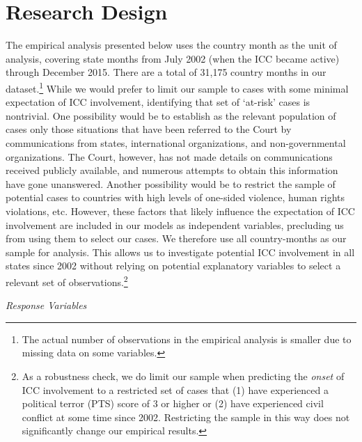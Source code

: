 \section*{Research Design}

The empirical analysis presented below uses the country month as the unit of analysis, covering state months from July 2002 (when the ICC became active) through December 2015. There are a total of 31,175 country months in our dataset.\footnote{The actual number of observations in the empirical analysis is smaller due to missing data on some variables.} While we would prefer to limit our sample to cases with some minimal expectation of ICC involvement, identifying that set of `at-risk' cases is nontrivial. One possibility would be to establish as the relevant population of cases only those situations that have been referred to the Court by communications from states, international organizations, and non-governmental organizations. The Court, however, has not made details on communications received publicly available, and numerous attempts to obtain this information have gone unanswered. Another possibility would be to restrict the sample of potential cases to countries with high levels of one-sided violence, human rights violations, etc. However, these factors that likely influence the expectation of ICC involvement are included in our models as independent variables, precluding us from using them to select our cases. We therefore use all country-months as our sample for analysis. This allows us to investigate potential ICC involvement in all states since 2002 without relying on potential explanatory variables to select a relevant set of observations.\footnote{As a robustness check, we do limit our sample when predicting the \emph{onset} of ICC involvement to a restricted set of cases that (1) have experienced a political terror (PTS) score of 3 or higher or (2) have experienced civil conflict at some time since 2002. Restricting the sample in this way does not significantly change our empirical results.}

\emph{Response Variables}

